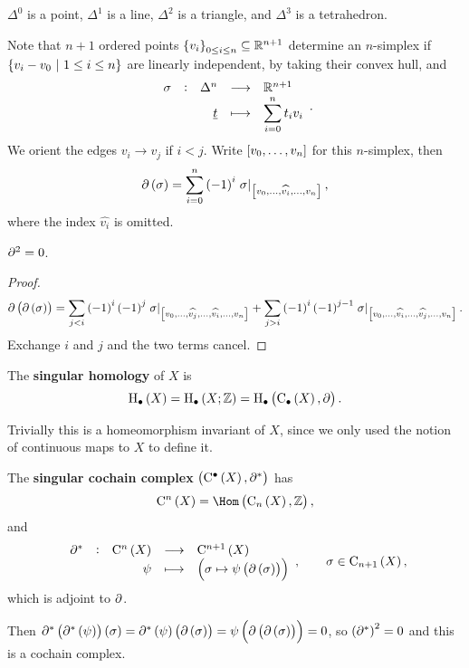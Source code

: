 \begin{example*}
$ \Delta^0 $ is a point, $ \Delta^1 $ is a line, $ \Delta^2 $ is a triangle, and $ \Delta^3 $ is a tetrahedron.
\end{example*}

Note that $ n + 1 $ ordered points $ \cbr{v_i}_{0 \le i \le n} \subseteq \RR^{n + 1} $ determine an $ n $-simplex if $ \cbr{v_i - v_0 \st 1 \le i \le n} $ are linearly independent, by taking their convex hull, and
$$ \function[\sigma]{\Delta^n}{\RR^{n + 1}}{\underline{t}}{\displaystyle\sum_{i = 0}^n t_iv_i}. $$
We orient the edges $ v_i \to v_j $ if $ i < j $. Write $ \sbr{v_0, \dots, v_n} $ for this $ n $-simplex, then
$$ \da\br{\sigma} = \sum_{i = 0}^n \br{-1}^i\eval{\sigma}_{\sbr{v_0, \dots, \widehat{v_i}, \dots, v_n}}, $$
where the index $ \widehat{v_i} $ is omitted.

\pagebreak

\begin{lemma}
$ \partial^2 = 0 $.
\end{lemma}

\begin{proof}
$$ \da\br{\da\br{\sigma}} = \sum_{j < i} \br{-1}^i\br{-1}^j\eval{\sigma}_{\sbr{v_0, \dots, \widehat{v_j}, \dots, \widehat{v_i}, \dots, v_n}} + \sum_{j > i} \br{-1}^i\br{-1}^{j - 1}\eval{\sigma}_{\sbr{v_0, \dots, \widehat{v_i}, \dots, \widehat{v_j}, \dots, v_n}}. $$
Exchange $ i $ and $ j $ and the two terms cancel.
\end{proof}

\begin{definition*}
The \textbf{singular homology} of $ X $ is
$$ \H_\bullet\br{X} = \H_\bullet\br{X; \ZZ} = \H_\bullet\br{\C_\bullet\br{X}, \da}. $$
\end{definition*}

Trivially this is a homeomorphism invariant of $ X $, since we only used the notion of continuous maps to $ X $ to define it.

\begin{definition*}
The \textbf{singular cochain complex} $ \br{\C^\bullet\br{X}, \da^*} $ has
$$ \C^n\br{X} = \Hom\br{\C_n\br{X}, \ZZ}, $$
and
$$ \function[\da^*]{\C^n\br{X}}{\C^{n + 1}\br{X}}{\psi}{\br{\sigma \mapsto \psi\br{\da\br{\sigma}}}}, \qquad \sigma \in \C_{n + 1}\br{X}, $$
which is adjoint to $ \partial $.
\end{definition*}

Then $ \da^*\br{\da^*\br{\psi}}\br{\sigma} = \da^*\br{\psi}\br{\da\br{\sigma}} = \psi\br{\da\br{\da\br{\sigma}}} = 0 $, so $ \br{\da^*}^2 = 0 $ and this is a cochain complex.

